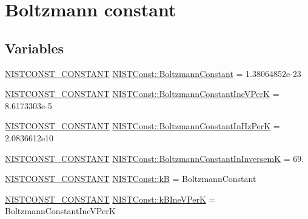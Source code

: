\hypertarget{group___n_i_s_t_const-_boltzmann_constant}{}\section{Boltzmann constant}
\label{group___n_i_s_t_const-_boltzmann_constant}
\subsection*{Variables}
\begin{DoxyCompactItemize}
\item 
\mbox{\hyperlink{group___n_i_s_t_const-_macros_ga2b0fc1d7452373f816175dd86ce26729}{N\+I\+S\+T\+C\+O\+N\+S\+T\+\_\+\+C\+O\+N\+S\+T\+A\+NT}} \mbox{\hyperlink{group___n_i_s_t_const-_boltzmann_constant_ga9a66c4988ef0f1d8298d0f43ccea6f1f}{N\+I\+S\+T\+Const\+::\+Boltzmann\+Constant}} = 1.\+38064852e-\/23
\item 
\mbox{\hyperlink{group___n_i_s_t_const-_macros_ga2b0fc1d7452373f816175dd86ce26729}{N\+I\+S\+T\+C\+O\+N\+S\+T\+\_\+\+C\+O\+N\+S\+T\+A\+NT}} \mbox{\hyperlink{group___n_i_s_t_const-_boltzmann_constant_ga8c0cb1b4b0d54e1a5bf735efaef8d349}{N\+I\+S\+T\+Const\+::\+Boltzmann\+Constant\+Ine\+V\+PerK}} = 8.\+6173303e-\/5
\item 
\mbox{\hyperlink{group___n_i_s_t_const-_macros_ga2b0fc1d7452373f816175dd86ce26729}{N\+I\+S\+T\+C\+O\+N\+S\+T\+\_\+\+C\+O\+N\+S\+T\+A\+NT}} \mbox{\hyperlink{group___n_i_s_t_const-_boltzmann_constant_gae7c3bd9c33c056465e2fe1e8e6f5bbd2}{N\+I\+S\+T\+Const\+::\+Boltzmann\+Constant\+In\+Hz\+PerK}} = 2.\+0836612e10
\item 
\mbox{\hyperlink{group___n_i_s_t_const-_macros_ga2b0fc1d7452373f816175dd86ce26729}{N\+I\+S\+T\+C\+O\+N\+S\+T\+\_\+\+C\+O\+N\+S\+T\+A\+NT}} \mbox{\hyperlink{group___n_i_s_t_const-_boltzmann_constant_ga03a6526c1016d67e765abded43b37f36}{N\+I\+S\+T\+Const\+::\+Boltzmann\+Constant\+In\+InversemK}} = 69.
\item 
\mbox{\hyperlink{group___n_i_s_t_const-_macros_ga2b0fc1d7452373f816175dd86ce26729}{N\+I\+S\+T\+C\+O\+N\+S\+T\+\_\+\+C\+O\+N\+S\+T\+A\+NT}} \mbox{\hyperlink{group___n_i_s_t_const-_boltzmann_constant_gad380fd5e3ca97fb5fc7a473a82789b82}{N\+I\+S\+T\+Const\+::kB}} = Boltzmann\+Constant
\item 
\mbox{\hyperlink{group___n_i_s_t_const-_macros_ga2b0fc1d7452373f816175dd86ce26729}{N\+I\+S\+T\+C\+O\+N\+S\+T\+\_\+\+C\+O\+N\+S\+T\+A\+NT}} \mbox{\hyperlink{group___n_i_s_t_const-_boltzmann_constant_gaff1f95d2460f026bdffd566e2569ff6d}{N\+I\+S\+T\+Const\+::k\+B\+Ine\+V\+PerK}} = Boltzmann\+Constant\+Ine\+V\+PerK

\end{DoxyCompactItemize}
